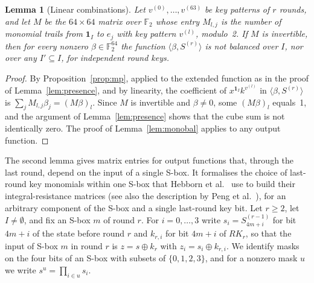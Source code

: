 \documentclass[11pt,a4paper]{article}
\newtheorem{lemma}{Lemma}
\theoremstyle{definition}
\theoremstyle{remark}
\newcommand{\F}{\mathbb{F}_2}
\begin{document}
\begin{lemma}[Linear combinations]\label{lem:lincomb}
Let $v^{(0)},\dots,v^{(63)}$ be key patterns of $r$ rounds, and let $M$ be the $64\times64$ matrix over $\F$ whose entry $M_{l,j}$ is the number of monomial trails from $\mathbf 1_I$ to $e_j$ with key pattern $v^{(l)}$, modulo~2. If $M$ is invertible, then for every nonzero $\beta\in\F^{64}$ the function $\langle\beta,S^{(r)}\rangle$ is not balanced over $I$, nor over any $I'\subseteq I$, for independent round keys.
\end{lemma}
\begin{proof}
By Proposition~\ref{prop:mp}, applied to the extended function as in the proof of Lemma~\ref{lem:presence}, and by linearity, the coefficient of $x^{\mathbf 1_I}k^{v^{(l)}}$ in $\langle\beta,S^{(r)}\rangle$ is $\sum_j M_{l,j}\beta_j=(M\beta)_l$. Since $M$ is invertible and $\beta\neq0$, some $(M\beta)_l$ equals~1, and the argument of Lemma~\ref{lem:presence} shows that the cube sum is not identically zero. The proof of Lemma~\ref{lem:monobal} applies to any output function.
\end{proof}

The second lemma gives matrix entries for output functions that, through the last round, depend on the input of a single S-box. It formalises the choice of last-round key monomials within one S-box that Hebborn et al.~\cite{hebborn2021} use to build their integral-resistance matrices (see also the description by Peng et al.~\cite{peng2026}), for an arbitrary component of the S-box and a single last-round key bit. Let $r\ge2$, let $I\neq\emptyset$, and fix an S-box $m$ of round $r$. For $i=0,\dots,3$ write $s_i=S^{(r-1)}_{4m+i}$ for bit $4m+i$ of the state before round $r$ and $k_{r,i}$ for bit $4m+i$ of $RK_r$, so that the input of S-box $m$ in round $r$ is $z=s\oplus k_{r}$ with $z_i=s_i\oplus k_{r,i}$. We identify masks on the four bits of an S-box with subsets of $\{0,1,2,3\}$, and for a nonzero mask $u$ we write $s^u=\prod_{i\in u}s_i$.
\end{document}

